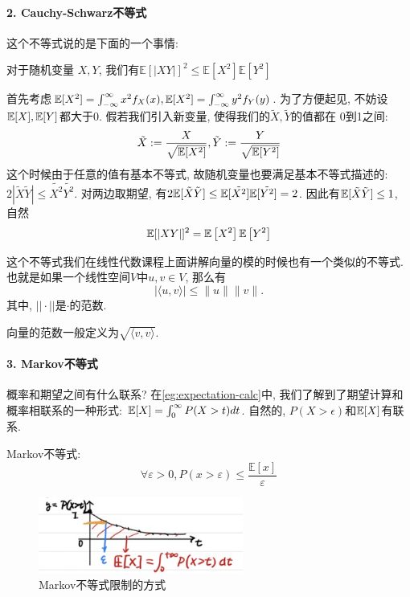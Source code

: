 \paragraph{2. Cauchy-Schwarz不等式}
这个不等式说的是下面的一个事情: 

对于随机变量  $ X, Y $, 我们有$ \mathbb{E}[|X Y|]^2 \leqslant \mathbb{E}\left[X^2\right] \mathbb{E}\left[Y^2\right]$
    
  
    
    首先考虑$\mathbb E[X^2] = \int_{-\infty}^{\infty} x^2 f_X(x), \mathbb E[X^2] = \int_{-\infty}^{\infty} y^2 f_Y(y)$. 为了方便起见, 不妨设$\mathbb E[X], \mathbb E[Y]$都大于0. 假若我们引入新变量, 使得我们的$\tilde{X}, \tilde{Y}$的值都在 0到1之间: 
    $$
    \tilde{X}:= \frac{X}{\sqrt{\mathbb E[X^2]}},\tilde{Y}:= \frac{Y}{\sqrt{\mathbb E[Y^2]}} 
    $$
    这个时候由于任意的值有基本不等式, 故随机变量也要满足基本不等式描述的: $2|\tilde{X}\tilde{Y}|\leq \tilde{X^2}\tilde{Y^2}$. 对两边取期望, 有$2\mathbb E[\tilde{X}\tilde{Y}]\leq \mathbb E[\tilde{X^2}]\mathbb E[\tilde{Y^2}]=2$. 因此有$\mathbb E[\tilde{X}\tilde{Y}]\leq 1$, 自然
    $$
        \mathbb E[|X Y|]^2 = \mathbb{E}\left[X^2\right] \mathbb{E}\left[Y^2\right]
    $$ 

    \begin{asidebox}
        这个不等式我们在线性代数课程上面讲解向量的模的时候也有一个类似的不等式. 也就是如果一个线性空间$V$中$u,v\in V$, 那么有
        $$
        |\langle u, v\rangle| \leq\|u\|\|v\|.
        $$
        其中, $||\cdot||$是$\cdot$的范数. 

        向量的范数一般定义为$\sqrt{\langle v, v\rangle}$. 
    \end{asidebox}

\paragraph{3. Markov不等式} 概率和期望之间有什么联系? 在\cref{eg:expectation-calc}中, 我们了解到了期望计算和概率相联系的一种形式: $\mathbb E[X]=\int_0^\infty P(X>t) dt$. 自然的, $P(X>\epsilon)$和$\mathbb E[X]$有联系. 

\begin{theorem}
    Markov不等式: 
    $$
\forall \varepsilon>0, P(x>\varepsilon) \leqslant \frac{\mathbb{E}[x]}{\varepsilon}
$$
\end{theorem}

\begin{figure}
    \includegraphics[width=0.6\textwidth]{fig/ch4/markov-ineq.jpg} 
    \caption{Markov不等式限制的方式}
    \label{fig:markov-ineq}
\end{figure}

